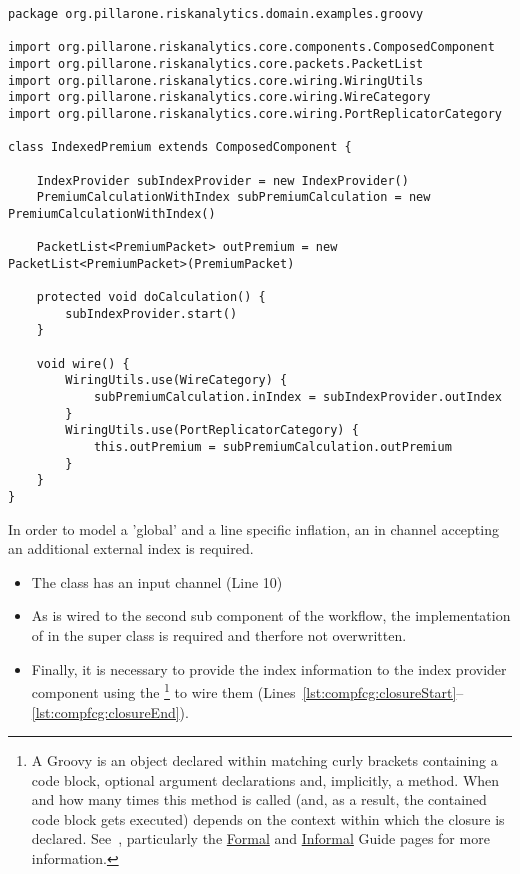 \begin{lstlisting}[label=lst:compcomp]
package org.pillarone.riskanalytics.domain.examples.groovy

import org.pillarone.riskanalytics.core.components.ComposedComponent
import org.pillarone.riskanalytics.core.packets.PacketList
import org.pillarone.riskanalytics.core.wiring.WiringUtils
import org.pillarone.riskanalytics.core.wiring.WireCategory
import org.pillarone.riskanalytics.core.wiring.PortReplicatorCategory

class IndexedPremium extends ComposedComponent {
    
    IndexProvider subIndexProvider = new IndexProvider()
    PremiumCalculationWithIndex subPremiumCalculation = new PremiumCalculationWithIndex()
    
    PacketList<PremiumPacket> outPremium = new PacketList<PremiumPacket>(PremiumPacket)

    protected void doCalculation() {
        subIndexProvider.start()
    }

    void wire() {
        WiringUtils.use(WireCategory) {
            subPremiumCalculation.inIndex = subIndexProvider.outIndex
        }
        WiringUtils.use(PortReplicatorCategory) {
            this.outPremium = subPremiumCalculation.outPremium
        }
    }
}\end{lstlisting}

In order to model a 'global' and a line specific inflation, an 
in channel accepting an additional external index is required.
\begin{itemize}
  \item The class has an input channel  (Line 10)
  \item As  is wired to the second sub component of the workflow,
   the implementation of  in the super class is required 
   and therfore not overwritten.\\
  \item Finally, it is necessary to provide the index information to the
    index provider component using the %
    \footnote{A Groovy 
		  is an object declared within matching curly brackets containing a code block, 
		  optional argument declarations and, implicitly, a  method. 
		  When and how many times this method is called (and, as a result, the contained
		  code block gets executed) depends on the context within which the closure 
		  is declared. See~\cite{GroovyClosures}, particularly 
		  the \href{http://groovy.codehaus.org/Closures+-+Formal+Definition}{Formal}
		  and \href{http://groovy.codehaus.org/Closures+-+Informal+Guide}{Informal}
		  Guide pages for more information.}
     to wire them 
    (Lines~\ref{lst:compfcg:closureStart}--\ref{lst:compfcg:closureEnd}).%
\end{itemize}

